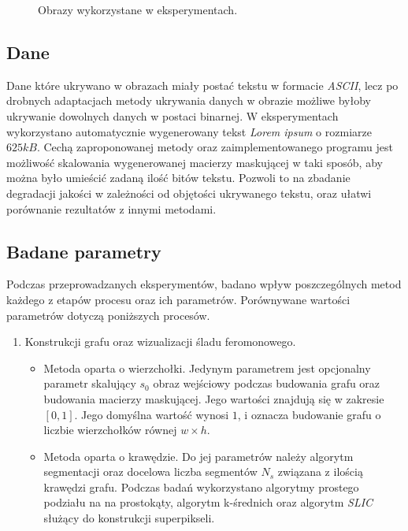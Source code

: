{{{\begin{figure}
                \caption[Porównanie obrazów]
                {Obrazy wykorzystane w eksperymentach.}
                \label{fig:exp-images}
            \end{figure}
        }

        \subsection{Dane}
        {
            Dane które ukrywano w obrazach miały postać tekstu w formacie \textit{ASCII}, lecz po drobnych adaptacjach
            metody ukrywania danych w obrazie możliwe byłoby ukrywanie dowolnych danych w postaci binarnej. W
            eksperymentach wykorzystano automatycznie wygenerowany tekst \textit{Lorem ipsum} o rozmiarze $625kB$. Cechą
            zaproponowanej metody oraz zaimplementowanego programu jest możliwość skalowania wygenerowanej macierzy
            maskującej w taki sposób, aby można było umieścić zadaną ilość bitów tekstu. Pozwoli to na zbadanie
            degradacji jakości w zależności od objętości ukrywanego tekstu, oraz ułatwi porównanie rezultatów z innymi
            metodami.
        }

        \subsection{Badane parametry}
        {
            Podczas przeprowadzanych eksperymentów, badano wpływ poszczególnych metod każdego z etapów procesu oraz ich
            parametrów. Porównywane wartości parametrów dotyczą poniższych procesów.

            \begin{enumerate}
                \item Konstrukcji grafu oraz wizualizacji śladu feromonowego.
                \begin{itemize}
                    \item Metoda oparta o wierzchołki. Jedynym parametrem jest opcjonalny parametr skalujący $s_0$ obraz
                    wejściowy podczas budowania grafu oraz budowania macierzy maskującej. Jego wartości znajdują się w
                    zakresie $[0, 1]$. Jego domyślna wartość wynosi $1$, i oznacza budowanie grafu o liczbie
                    wierzchołków równej $w \times h$.

                    \item Metoda oparta o krawędzie. Do jej parametrów należy algorytm segmentacji oraz docelowa liczba
                    segmentów $N_s$ związana z ilością krawędzi grafu. Podczas badań wykorzystano algorytmy prostego
                    podziału na na prostokąty, algorytm k-średnich oraz algorytm \textit{SLIC} służący do konstrukcji
                    superpikseli.
                \end{itemize}


\end{enumerate}}}}
